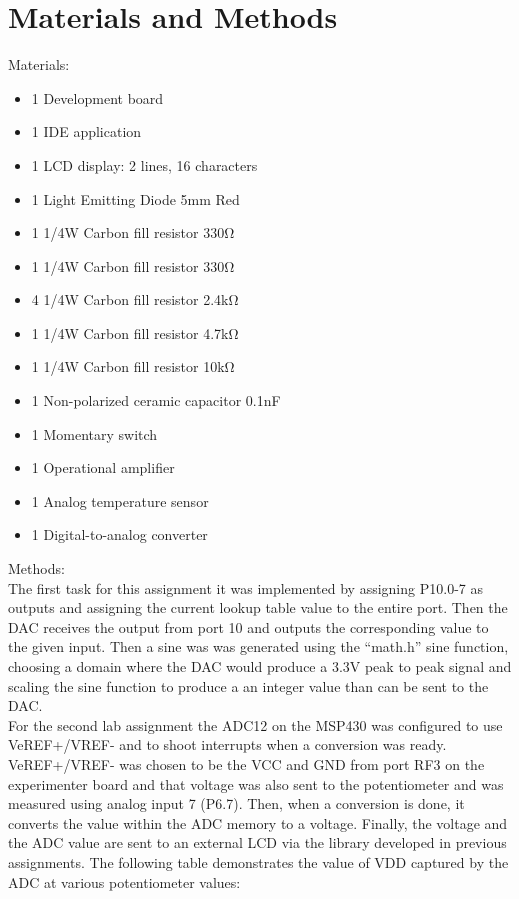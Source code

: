 \documentclass[journal]{IEEEtran}
\begin{document}
\section{Materials and Methods}
Materials:
\begin{itemize}
  \item 1 Development board
  \item 1 IDE application
  \item 1 LCD display: 2 lines, 16 characters
  \item 1 Light Emitting Diode 5\si{\milli\meter} Red
  \item 1 1/4W Carbon fill resistor 330\si{\ohm}
  \item 1 1/4W Carbon fill resistor 330\si{\ohm}
  \item 4 1/4W Carbon fill resistor 2.4\si{\kilo\ohm}
  \item 1 1/4W Carbon fill resistor 4.7\si{\kilo\ohm}
  \item 1 1/4W Carbon fill resistor 10\si{\kilo\ohm}
  \item 1 Non-polarized ceramic capacitor 0.1\si{\nano\farad}
  \item 1 Momentary switch
  \item 1 Operational amplifier
  \item 1 Analog temperature sensor
  \item 1 Digital-to-analog converter
\end{itemize}
Methods:\\
The first task for this assignment it was implemented by assigning P10.0-7 as outputs and assigning the current lookup table value to the entire port. Then the DAC receives the output from port 10 and outputs the corresponding value to the given input. Then a sine was was generated using the ``math.h'' sine function, choosing a domain where the DAC would produce a 3.3\si{\V} peak to peak signal and scaling the sine function to produce a an integer value than can be sent to the DAC.\\
For the second lab assignment the ADC12 on the MSP430 was configured to use VeREF+/VREF- and to shoot interrupts when a conversion was ready. VeREF+/VREF- was chosen to be the VCC and GND from port RF3 on the experimenter board and that voltage was also sent to the potentiometer and was measured using analog input 7 (P6.7). Then, when a conversion is done, it converts the value within the ADC memory to a voltage. Finally, the voltage and the ADC value are sent to an external LCD via the library developed in previous assignments. The following table demonstrates the value of VDD captured by the ADC at various potentiometer values:
\end{document}
